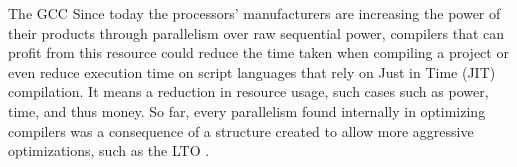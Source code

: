 \begin{section}{The GCC}
Since today the processors' manufacturers are increasing the power of their
products through parallelism over raw sequential power, compilers that can
profit from this resource could reduce the time taken when compiling a project
or even reduce execution time on script languages that rely on Just in Time
(JIT) compilation. It means a reduction in resource usage, such cases such as
power, time, and thus money. So far, every parallelism found internally in
optimizing compilers was a consequence of a structure created to allow more
aggressive optimizations, such as the LTO \citep{glek2010optimizing}.



\end{section}

